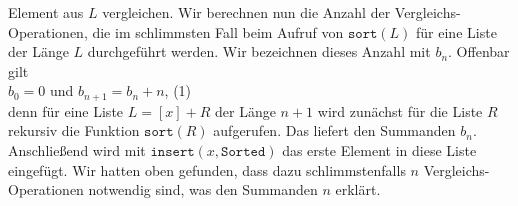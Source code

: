 Element aus $L$ vergleichen.  Wir berechnen nun die Anzahl der
Vergleichs-Operationen, die im schlimmsten Fall beim Aufruf von $\texttt{sort}(L)$ f\"ur
eine Liste der L\"ange $L$ durchgef\"uhrt werden.  Wir bezeichnen dieses Anzahl mit $b_n$.
Offenbar gilt \\[0.1cm]
\hspace*{1.3cm} $b_0 = 0$ \quad und \quad $b_{n+1} = b_n + n$, \hspace*{\fill} (1)\\[0.1cm]
denn f\"ur eine Liste $L = [x] + R$ der L\"ange $n+1$ wird zun\"achst f\"ur die Liste $R$ rekursiv
die Funktion $\mathtt{sort}(R)$ aufgerufen. Das liefert den Summanden $b_n$. Anschlie\ss{}end wird
mit $\mathtt{insert}(x, \mathtt{Sorted})$ 
das erste Element in diese Liste eingef\"ugt.  Wir hatten oben gefunden, dass dazu
schlimmstenfalls $n$
Vergleichs-Operationen notwendig sind, was den Summanden $n$ erkl\"art.

